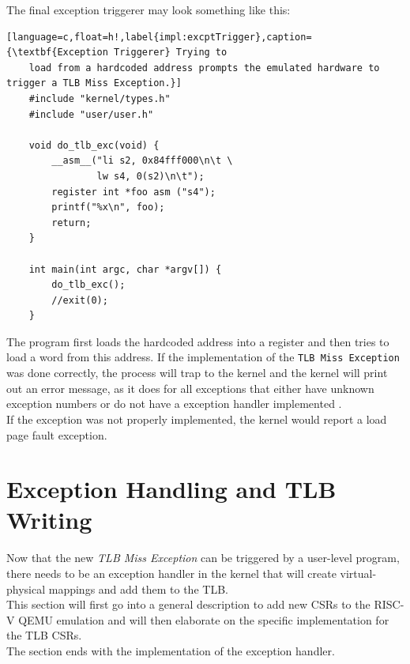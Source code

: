 The final exception triggerer may look something like this:

\begin{lstlisting}[language=c,float=h!,label{impl:excptTrigger},caption={\textbf{Exception Triggerer} Trying to
    load from a hardcoded address prompts the emulated hardware to trigger a TLB Miss Exception.}]
    #include "kernel/types.h"
    #include "user/user.h"

    void do_tlb_exc(void) {
        __asm__("li s2, 0x84fff000\n\t \
                lw s4, 0(s2)\n\t");
        register int *foo asm ("s4");
        printf("%x\n", foo);
        return;
    }
    
    int main(int argc, char *argv[]) {
        do_tlb_exc();
        //exit(0);
    }
\end{lstlisting}
The program first loads the hardcoded address into a register and then tries to load a word from this address.
If the implementation of the \texttt{TLB Miss Exception} was done correctly, the process will trap to the kernel
and the kernel will print out an error message, as it does for all exceptions that either have unknown exception
numbers or do not have a exception handler implemented \cite{cox2011xv6}.\\
If the exception was not properly implemented, the kernel would report a load page fault exception.




\section{Exception Handling and TLB Writing}
\label{sect:tlbwrite}

Now that the new \textit{TLB Miss Exception} can be triggered by a user-level program, there needs
to be an exception handler in the kernel that will create virtual-physical mappings and add them to the
TLB.\\
This section will first go into a general description to add new CSRs to the RISC-V QEMU emulation and
will then elaborate on the specific implementation for the TLB CSRs.\\
The section ends with the implementation of the exception handler.

